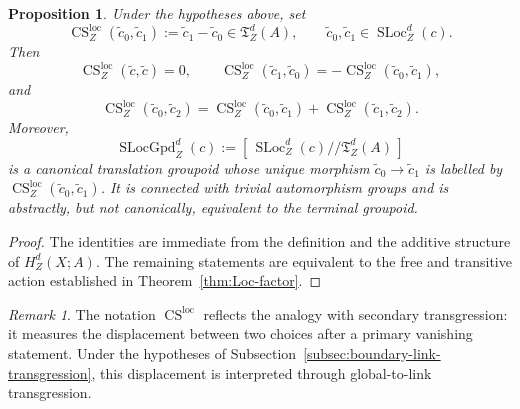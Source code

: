 \documentclass[10pt,a4paper,dvipsnames,x11names]{amsart}
\newcommand{\SLoc}{\operatorname{SLoc}}
\newcommand{\TLoc}{\mathfrak T}
\newcommand{\CSLoc}{\operatorname{CS}^{\mathrm{loc}}}
\newcommand{\SLocGpd}{\operatorname{SLocGpd}}
\numberwithin{equation}{section}
\theoremstyle{plain}
\newtheorem{proposition}[proposition]{Proposition}
\theoremstyle{definition}
\theoremstyle{remark}
\newtheorem{remark}[remark]{Remark}
\begin{document}
\begin{proposition}\label{prop:secondary-translation-groupoid}
Under the hypotheses above, set
\[
\CSLoc_Z(\widetilde c_0,\widetilde c_1)
:=
\widetilde c_1-\widetilde c_0
\in\TLoc_Z^d(A),
\qquad
\widetilde c_0,\widetilde c_1\in\SLoc_Z^d(c).
\]
Then
\[
\CSLoc_Z(\widetilde c,\widetilde c)=0,
\qquad
\CSLoc_Z(\widetilde c_1,\widetilde c_0)=-\CSLoc_Z(\widetilde c_0,\widetilde c_1),
\]
and
\[
\CSLoc_Z(\widetilde c_0,\widetilde c_2)
=
\CSLoc_Z(\widetilde c_0,\widetilde c_1)
+
\CSLoc_Z(\widetilde c_1,\widetilde c_2).
\]
Moreover,
\[
\SLocGpd_Z^d(c):=[\,\SLoc_Z^d(c)/\!/\TLoc_Z^d(A)\,]
\]
is a canonical translation groupoid whose unique morphism $\widetilde c_0\to\widetilde c_1$ is labelled by $\CSLoc_Z(\widetilde c_0,\widetilde c_1)$. It is connected with trivial automorphism groups and is abstractly, but not canonically, equivalent to the terminal groupoid.
\end{proposition}

\begin{proof}
The identities are immediate from the definition and the additive structure of $H_Z^d(X;A)$. The remaining statements are equivalent to the free and transitive action established in Theorem~\ref{thm:Loc-factor}.
\end{proof}

\begin{remark}\label{rem:functorial-secondary-ambiguity}
The notation $\CSLoc$ reflects the analogy with secondary transgression: it measures the displacement between two choices after a primary vanishing statement. Under the hypotheses of Subsection~\ref{subsec:boundary-link-transgression}, this displacement is interpreted through global-to-link transgression.
\end{remark}
\end{document}
